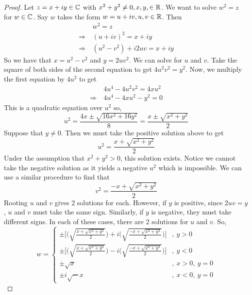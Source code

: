 \documentclass[11pt]{article}
\begin{document}
\begin{proof}
	Let $z = x+iy \in \mathbb{C}$ with $x^2+y^2 \neq 0, x, y, \in \mathbb{R}$. We want to
	solve $w^2 = z$ for $w \in \mathbb{C}$. Say $w$ takes the form $w = u+iv, u, v \in
	\mathbb{R}$. Then
	\begin{align*}
		& \> w^2 = z\\
		\Rightarrow & \> (u+iv)^2 = x+iy\\
		\Rightarrow & \> (u^2-v^2)+i2uv = x+iy
	\end{align*}
	So we have that $x = u^2-v^2$ and $y = 2uv^2$. We can solve for $u$ and
	$v$. Take the square of both sides of the second equation to get $4u^2v^2 =
	y^2$. Now, we multiply the first equation by $4u^2$ to get
	\begin{align*}
		& \> 4u^4-4u^2v^2 = 4xu^2\\
		\Rightarrow & \> 4u^4-4xu^2-y^2 = 0
	\end{align*}
	This is a quadratic equation over $u^2$ so,
	\begin{equation*}
		u^2 = \frac{4x \pm \sqrt{16x^2+16y^2}}{8} = \frac{x \pm \sqrt{x^2 +
		y^2}}{2}
	\end{equation*}
	Suppose that $y \neq 0$. Then we must take the positive solution above to
	get
	\begin{equation*}
		u^2 = \frac{x+\sqrt{x^2+y^2}}{2}
	\end{equation*}
	Under the assumption that $x^2+y^2 > 0$, this solution exists. Notice we
	cannot take the negative solution as it yields a negative $u^2$ which is
	impossible. We can use a similar procedure to find that
	\begin{equation*}
		v^2 = \frac{-x+\sqrt{x^2+y^2}}{2}
	\end{equation*}
	Rooting $u$ and $v$ gives 2 solutions for each. However, if $y$ is positive,
	since $2uv = y$, $u$ and $v$ must take the same sign. Similarly, if $y$ is
	negative, they must take different signs. In each of these cases, there are
	2 solutions for $u$ and $v$. So,
	\begin{equation*}
		w =
		\begin{cases}
			\pm \Bigg[ \bigg(\sqrt{\frac{x+\sqrt{x^2+y^2}}{2}}\bigg) +
			i\bigg(\sqrt{\frac{-x+\sqrt{x^2+y^2}}{2}}\bigg)\Bigg] &, \> y >
			0\\
			\pm \Bigg[ \bigg(\sqrt{\frac{x+\sqrt{x^2+y^2}}{2}}\bigg) -
			i\bigg(\sqrt{\frac{-x+\sqrt{x^2+y^2}}{2}}\bigg)\Bigg] &, \> y <
			0\\
			\pm \sqrt x &, \> x > 0,\> y = 0\\
			\pm i\sqrt -x &, \> x < 0,\> y = 0
		\end{cases}
	\end{equation*}
\end{proof}
\end{document}
